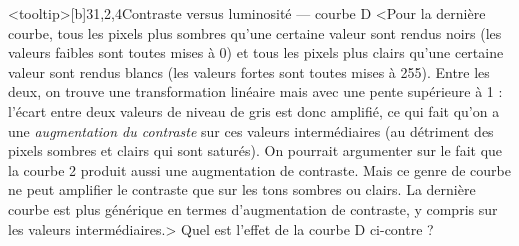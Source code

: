 \begin{quiz}[title={Photographie numérique}]
\vspace{-\baselineskip}
%
\begin{quizquestion*}<tooltip>[b]{3}{1,2,4}{Contraste {\upshape versus} luminosité --- courbe D}
<Pour la dernière courbe, tous les pixels plus sombres qu'une certaine valeur sont rendus noirs (les valeurs faibles sont toutes mises à 0) et tous les pixels plus clairs qu'une certaine valeur sont rendus blancs (les valeurs fortes sont toutes mises à 255). Entre les deux, on trouve une transformation linéaire mais avec une pente supérieure à 1 : l'écart entre deux valeurs de niveau de gris est donc amplifié, ce qui fait qu'on a une \emph{augmentation du contraste} sur ces valeurs intermédiaires (au détriment des pixels sombres et clairs qui sont saturés). On pourrait argumenter sur le fait que la courbe 2 produit aussi une augmentation de contraste. Mais ce genre de courbe ne peut amplifier le contraste que sur les tons sombres ou clairs. La dernière courbe est plus générique en termes d'augmentation de contraste, y compris sur les valeurs intermédiaires.>
Quel est l'effet de la courbe D ci-contre ?
\end{quizquestion*}
\end{quiz}

